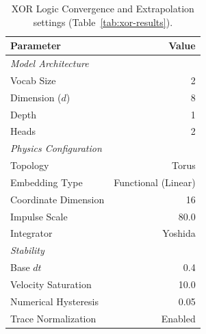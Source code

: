 \documentclass[12pt,a4paper]{article}
\begin{document}
\begin{table}[H]
    \centering
    \setlength{\tabcolsep}{10pt}
    \setlength{\extrarowheight}{3pt}
    \caption{XOR Logic Convergence and Extrapolation settings (Table~\ref{tab:xor-results}).}
    \label{tab:gfn-xor-config}
    \begin{tabular}{p{5.5cm}r}
        \toprule
        \textbf{Parameter} & \textbf{Value} \\
        \midrule
        \textit{Model Architecture} & \\
        \hspace{4pt}Vocab Size & 2 \\
        \hspace{4pt}Dimension ($d$) & 8 \\
        \hspace{4pt}Depth & 1 \\
        \hspace{4pt}Heads & 2 \\
        \midrule
        \textit{Physics Configuration} & \\
        \hspace{4pt}Topology & Torus \\
        \hspace{4pt}Embedding Type & Functional (Linear) \\
        \hspace{4pt}Coordinate Dimension & 16 \\
        \hspace{4pt}Impulse Scale & 80.0 \\
        \hspace{4pt}Integrator & Yoshida \\
        \midrule
        \textit{Stability} & \\
        \hspace{4pt}Base $dt$ & 0.4 \\
        \hspace{4pt}Velocity Saturation & 10.0 \\
        \hspace{4pt}Numerical Hysteresis & 0.05 \\
        \hspace{4pt}Trace Normalization & Enabled \\
        \bottomrule
    \end{tabular}
\end{table}
\end{document}
